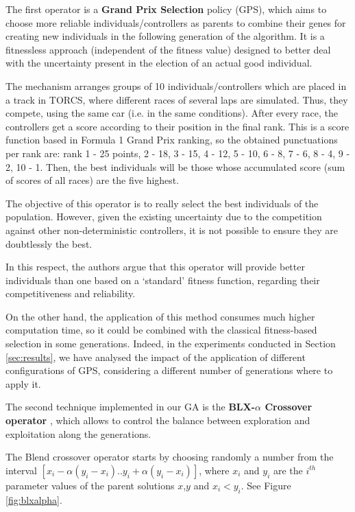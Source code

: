\documentclass[10pt,journal,compsoc]{IEEEtran}
\begin{document}
The first operator is a \textbf{Grand Prix Selection} policy (GPS), which aims to choose more reliable individuals/controllers as parents to combine their genes for creating new individuals in the following generation of the algorithm.
It is a fitnessless approach (independent of the fitness value) designed to better deal with the uncertainty present in the election of an actual good individual. 

The mechanism arranges groups of 10 individuals/controllers which are placed in a track in TORCS, where different races of several laps are simulated. Thus, they compete, using the same car (i.e. in the same conditions). After every race, the controllers get a score according to their position in the final rank. This is a score function based in Formula 1 Grand Prix ranking, so the obtained punctuations per rank are: rank 1 - 25 points, 2 - 18, 3 - 15, 4 - 12, 5 - 10, 6 - 8, 7 - 6, 8 - 4, 9 - 2, 10 - 1.
Then, the best individuals will be those whose accumulated score (sum of scores of all races) are the five highest.

The objective of this operator is to really select the best individuals of the population. However, given the existing uncertainty \cite{merelo2016statistical} due to the competition against other non-deterministic controllers, it is not possible to ensure they are doubtlessly the best.

In this respect, the authors argue that this operator will provide better individuals than one based on a `standard' fitness function, regarding their competitiveness and reliability.

On the other hand, the application of this method consumes much higher computation time, so it could be combined with the classical fitness-based selection in some generations. Indeed, in the experiments conducted in Section \ref{sec:results}, we have analysed the impact of the application of different configurations of GPS, considering a different number of generations where to apply it.


The second technique implemented in our GA is the \textbf{BLX-$\alpha$ Crossover operator} \cite{blx2008}, which allows to control the balance between exploration and exploitation along the generations.

The Blend crossover operator starts by choosing randomly a number from the interval $[x_i-\alpha(y_i-x_i).. y_i+\alpha(y_i-x_i)]$, where $x_i$ and $y_i$ are the $i^{th}$ parameter values of the parent solutions $x$,$y$ and $x_i < y_i$. See Figure \ref{fig:blxalpha}.
\end{document}
